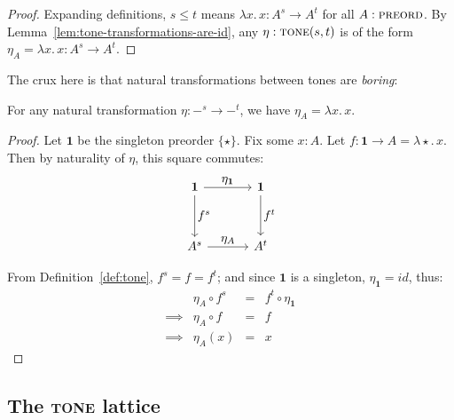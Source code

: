 \documentclass[b5,wide,libertine,ribbons]{rntz}
\newcommand{\mb}[1]{\ensuremath{\mathbf{#1}}}
\newcommand{\mi}[1]{\ensuremath{\mathit{#1}}}
\newcommand{\fn}{\lambda}
\newcommand{\binder}{.\,}
\newcommand{\bind}[1]{{#1}\binder}
\newcommand{\fnof}[1]{\fn\bind{#1}}
\newcommand{\cat}[1]{\textsc{#1}} %
\newcommand{\Pre}{\cat{preord}}
\newcommand{\Tone}{\cat{tone}}
\newcommand{\idfn}{\mi{id}}
\begin{document}
\begin{proof}
  Expanding definitions, $s \le t$ means $\fnof{x} x : A^s \to A^t$ for all $A :
  \Pre$. By Lemma~\ref{lem:tone-transformations-are-id}, any $\eta : \Tone(s,t)$
  is of the form $\eta_A = \fnof{x} x : A^s \to A^t$.
\end{proof}

The crux here is that natural transformations between tones are \emph{boring}:
\begin{lemma}\label{lem:tone-transformations-are-id}
  For any natural transformation $\eta : -^s \to -^t$, we have $\eta_A = \fnof{x} x$.
\end{lemma}

\begin{proof}
  Let $\mb{1}$ be the singleton preorder $\{\star\}$. Fix some $x : A$. Let $f :
  \mb{1} \to A = \fnof{\star} x$. Then by naturality of $\eta$, this square
  commutes:
  \[\tikzset{
    no line/.style={draw=none,
      commutative diagrams/every label/.append style={/tikz/auto=false}}}
  \begin{tikzcd}[sep=3.3em]
    \mb{1} \arrow[r,"\textstyle \eta_{\mb{1}}"] \arrow[d,"\textstyle f^s"]
    & \mb{1} \arrow[d,"\textstyle f^t"]
    \\ A^s \arrow[r,"\textstyle\eta_A"]
    & A^t
  \end{tikzcd}\]

From Definition~\ref{def:tone}, $f^s = f = f^t$; and since $\mb{1}$ is a
singleton, $\eta_{\mb{1}} = \idfn$, thus:
  \[\begin{array}{rlcl}
  & \eta_A \circ f^s &=& f^t \circ \eta_{\mb{1}}\\
  \implies & \eta_A \circ f &=& f\\
  \implies & \eta_A(x) &=& x
  \end{array}\]
\end{proof}




\subsection{The \Tone{} lattice}
\end{document}
